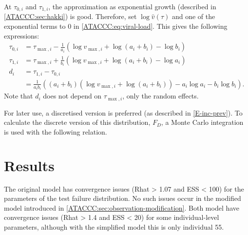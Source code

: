 \documentclass[thesis.tex]{subfiles}
\begin{document}
At $\tau_{0,i}$ and $\tau_{1,i}$, the approximation as exponential growth (described in \cref{ATACCC:sec:hakki}) is good.
Therefore, set $\log \hat{v}(\tau)$ and one of the exponential terms to 0 in \cref{ATACCC:eq:viral-load}.
This gives the following expressions:
$$
\begin{aligned}
\tau_{0,i}
&= \tau_{\max,i} - \frac{1}{a_i} \left(\log v_{\max,i} + \log(a_i + b_i) - \log b_i \right) \\
\tau_{1,i}
&= \tau_{\max,i} + \frac{1}{b_i} \left(\log v_{\max,i} + \log(a_i + b_i) - \log a_i \right) \\
d_i
&= \tau_{1,i} - \tau_{0,i}  \\
&= \frac{1}{a_i b_i} \left( (a_i + b_i) (\log v_{\max,i} + \log(a_i + b_i)) - a_i \log a_i - b_i \log b_i \right).
\end{aligned}
$$
Note that $d_i$ does not depend on $\tau_{\max,i}$, only the random effects.

For later use, a discretised version is preferred (as described in \cref{E-inc-prev}).
To calculate the discrete version of this distribution, $F_D$, a Monte Carlo integration is used with the following relation.
\section{Results} \label{ATACCC:sec:results-discussion}

The original \textcite{hakkiOnset} model has convergence issues (Rhat > 1.07 and ESS < 100) for the parameters of the test failure distribution.
No such issues occur in the modified model introduced in \cref{ATACCC:sec:observation-modification}.
Both model have convergence issues (Rhat > 1.4 and ESS < 20) for some individual-level parameters, although with the simplified model this is only individual 55.
\end{document}
